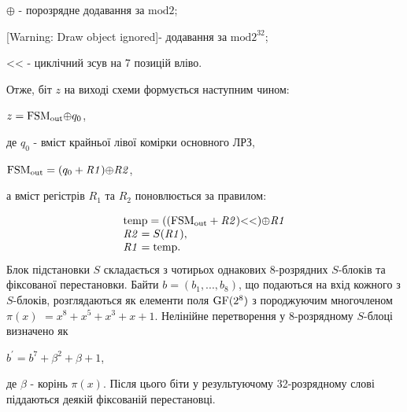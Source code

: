 \documentclass[a4paper]{article}
\newcounter{}
\newcommand\normalsubformula[1]{\text{\mathversion{normal}$#1$}}
\begin{document}
 ${{\oplus}}$ - порозрядне додавання за  ${\text{mod}2}$;

[Warning: Draw object ignored]{}- додавання за  ${\text{mod}2^{{\text{32}}}}$;

{\textless}{\textless} {}- циклічний зсув на 7 позицій вліво.

Отже, біт  ${z}$ на виході схеми формується наступним чином:

{\centering

${z=\normalsubformula{\text{FSM}}_{{\normalsubformula{\text{out}}}}{\oplus}q_{{0}}}$,
\par}

де  ${q_{{0}}}$ - вміст крайньої лівої комірки  основного ЛРЗ,

{\centering

${\normalsubformula{\text{FSM}}_{{\normalsubformula{\text{out}}}}=(q_{{0}}+\mathit{R1}){\oplus}\mathit{R2}}$,
\par}

а вміст регістрів  ${R_{{1}}}$ та  ${R_{{2}}}$ поновлюється за правилом:

\begin{equation*}
\begin{matrix}{\normalsubformula{\text{temp}}=((\normalsubformula{\text{FSM}}_{{\normalsubformula{\text{out}}}}+\mathit{R2})\text{{\textless}{\textless}}){\oplus}\mathit{R1}}\hfill\null
\\\mathit{R2}=S(\mathit{R1}),\hfill\null
\\\mathit{R1}=\normalsubformula{\text{temp}}\text{.}\hfill\null
\end{matrix}\hfill 
\end{equation*}
Блок підстановки  ${S}$ складається з чотирьох однакових 8-розрядних 
${S}${}-блоків та фіксованої перестановки. Байти 
${b=(b_{{1}},\text{.}\text{.}\text{.},b_{{8}})}$, що подаються на вхід кожного
з  ${S}${}-блоків, розглядаються як елементи поля 
${\normalsubformula{\text{GF}}(2^{{8}})}$ з породжуючим многочленом   ${\pi
(x)}$ ${=x^{{8}}+x^{{5}}+x^{{3}}+x+1}$. Нелінійне перетворення у 8-розрядному 
${S}${}-блоці визначено як

{\centering
 ${{b}^{'}=b^{{7}}+\beta ^{{2}}+\beta +1}$,
\par}

де  ${\beta }$ - корінь  ${\pi (x)}$. Після цього біти у результуючому
32-розрядному слові піддаються деякій фіксованій перестановці.


\bigskip

{\par}
\end{document}
